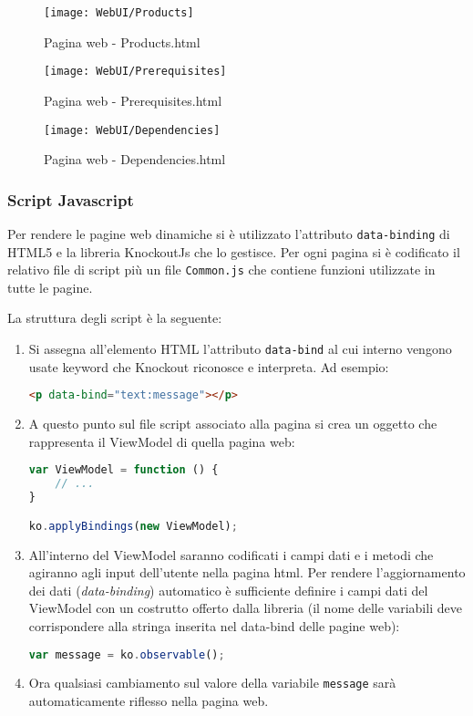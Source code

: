 \documentclass[../RelazioneFinale.tex]{subfiles}
\begin{document}
				\begin{figure}[p]
					\texttt{[image: WebUI/Products]}
					\caption{Pagina web - Products.html}
					\label{fig:Products}
				\end{figure}
		
				\begin{figure}[p]
					\texttt{[image: WebUI/Prerequisites]}
					\caption{Pagina web - Prerequisites.html}
					\label{fig:Prerequisites}
				\end{figure}
				
				\begin{figure}[p]
					\texttt{[image: WebUI/Dependencies]}
					\caption{Pagina web - Dependencies.html}
					\label{fig:Dependencies}
				\end{figure}							
\newpage				
				\subsubsection{Script Javascript}
					Per rendere le pagine web dinamiche si è utilizzato l'attributo \verb|data-binding| di HTML5 e la libreria KnockoutJs che lo gestisce.
					Per ogni pagina si è codificato il relativo file di script più un file \verb|Common.js| che contiene funzioni utilizzate in tutte le pagine.
					
					La struttura degli script è la seguente:
					\begin{enumerate}
					
						\item Si assegna all'elemento HTML l'attributo \verb|data-bind| al cui interno vengono usate keyword che Knockout riconosce e interpreta. Ad esempio:
						\begin{lstlisting}[language=html]
<p data-bind="text:message"></p>
						\end{lstlisting}
						
						\item A questo punto sul file script associato alla pagina si crea un oggetto che rappresenta il ViewModel di quella pagina web:
						\begin{lstlisting}[language=Javascript]
var ViewModel = function () {
	// ...
}

ko.applyBindings(new ViewModel);
						\end{lstlisting}
						
						\item All'interno del ViewModel saranno codificati i campi dati e i metodi che agiranno agli input dell'utente nella pagina html. Per rendere l'aggiornamento dei dati (\emph{data-binding}) automatico è sufficiente definire i campi dati del ViewModel con un costrutto offerto dalla libreria (il nome delle variabili deve corrispondere alla stringa inserita nel data-bind delle pagine web):
						\begin{lstlisting}[language=Javascript]
var message = ko.observable();
						\end{lstlisting}
						
						\item Ora qualsiasi cambiamento sul valore della variabile \verb|message| sarà automaticamente riflesso nella pagina web.
					\end{enumerate}
				
\end{document}
